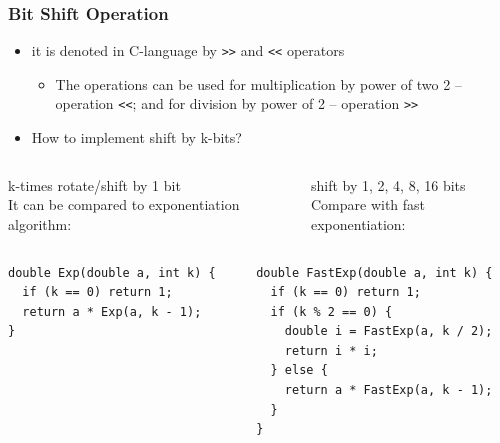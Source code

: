 \documentclass{beamer}
\begin{document}
\begin{frame}[fragile,shrink=5]
\frametitle{Bit Shift Operation}

\begin{itemize}
\item it is denoted in C-language by \texttt{>>} and \texttt{<<} operators
\begin{itemize}
\item The operations can be used for multiplication by power of two 2 -- operation \texttt{<<}; and for division by power of 2 -- operation \texttt{>>}
\end{itemize}
\item How to implement shift by k-bits?
\end{itemize}
\begin{columns}
\begin{column}{0.48\textwidth}
k-times rotate/shift by 1 bit\\
It can be compared to exponentiation algorithm:
\end{column}
\begin{column}{0.52\textwidth}
shift by 1, 2, 4, 8, 16 bits\\
Compare with fast exponentiation:
\end{column}
\end{columns}

\begin{columns}
\begin{column}{0.48\textwidth}
\begin{verbatim}
double Exp(double a, int k) {
  if (k == 0) return 1;
  return a * Exp(a, k - 1);
}
\end{verbatim}
\end{column}
\begin{column}{0.52\textwidth}
\begin{verbatim}
double FastExp(double a, int k) {
  if (k == 0) return 1;
  if (k % 2 == 0) {
    double i = FastExp(a, k / 2);
    return i * i;
  } else {
    return a * FastExp(a, k - 1);
  }
}
\end{verbatim}

\end{column}
\end{columns}



\end{frame}
\end{document}
